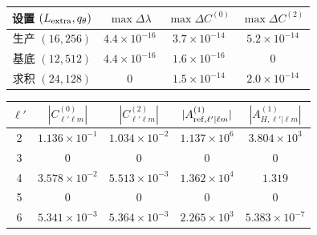 \documentclass[UTF8,fontset=fandol,11pt,a4paper,oneside]{ctexart}
\numberwithin{equation}{section}
\begin{document}
\par\addvspace{14pt}
\noindent\begin{minipage}{\linewidth}
\captionsetup{type=table}\caption{角向球谐截断与 Gauss 求积的独立检验。}\label{audit:tab:angular-convergence}
\centering\fontsize{10}{13.5}\selectfont
\setlength{\tabcolsep}{6pt}\renewcommand{\arraystretch}{1.2}
\begin{tabular}{cccc}\toprule
设置 $(L_{\rm extra},q_\theta)$ & $\max\Delta\lambda$ & $\max\Delta C^{(0)}$ & $\max\Delta C^{(2)}$\\\midrule
生产 $(16,256)$ & $4.4\times10^{-16}$ & $3.7\times10^{-14}$ & $5.2\times10^{-14}$\\
基底 $(12,512)$ & $4.4\times10^{-16}$ & $1.6\times10^{-16}$ & $0$\\
求积 $(24,128)$ & $0$ & $1.5\times10^{-14}$ & $2.0\times10^{-14}$\\
\bottomrule\end{tabular}
\end{minipage}\par\addvspace{10pt}
\par\addvspace{14pt}
\noindent\begin{minipage}{\linewidth}
\captionsetup{type=table}\caption{非线性目标角通道及选择定则结果。}\label{audit:tab:channels}
\centering\fontsize{10}{13.5}\selectfont
\setlength{\tabcolsep}{6pt}\renewcommand{\arraystretch}{1.2}
\begin{tabular}{ccccc}\toprule
$\ell'$ & $|C^{(0)}_{\ell'\ell m}|$ & $|C^{(2)}_{\ell'\ell m}|$ & $|A_{{\rm ref},\ell'|\ell m}^{(1)}|$ & $|A_{H,\ell'|\ell m}^{(1)}|$\\\midrule
2 & $1.136\times10^{-1}$ & $1.034\times10^{-2}$ & $1.137\times10^{6}$ & $3.804\times10^{3}$\\
3 & $0$ & $0$ & $0$ & $0$\\
4 & $3.578\times10^{-2}$ & $5.513\times10^{-3}$ & $1.362\times10^{4}$ & $1.319$\\
5 & $0$ & $0$ & $0$ & $0$\\
6 & $5.341\times10^{-3}$ & $5.364\times10^{-3}$ & $2.265\times10^{3}$ & $5.383\times10^{-7}$\\
\bottomrule\end{tabular}
\end{minipage}\par\addvspace{10pt}
\par\addvspace{14pt}
\end{document}
